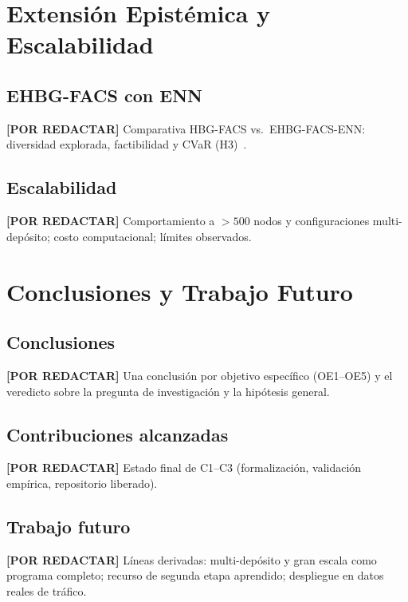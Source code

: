 \documentclass[12pt]{report}
\newcommand{\pendiente}[1]{\par\noindent\colorbox{lightbg}{%
  \begin{minipage}{0.94\linewidth}\small
  \textcolor{uanlgold}{\textbf{[POR REDACTAR]}} #1
  \end{minipage}}\par\medskip}
\begin{document}
\chapter{Extensi\'on Epist\'emica y Escalabilidad}\label{cap:enn}

\section{EHBG-FACS con ENN}\label{sec:enn-resultados}
\pendiente{Comparativa HBG-FACS vs.\ EHBG-FACS-ENN: diversidad explorada,
factibilidad y CVaR (H3)~\cite{ENN_GFN_2025}.}

\section{Escalabilidad}\label{sec:escalabilidad}
\pendiente{Comportamiento a $>500$ nodos y configuraciones multi-dep\'osito;
costo computacional; l\'imites observados.}

\chapter{Conclusiones y Trabajo Futuro}\label{cap:conclusiones}

\section{Conclusiones}\label{sec:conclusiones}
\pendiente{Una conclusi\'on por objetivo espec\'ifico (OE1--OE5) y el veredicto
sobre la pregunta de investigaci\'on y la hip\'otesis general.}

\section{Contribuciones alcanzadas}\label{sec:contrib-finales}
\pendiente{Estado final de C1--C3 (formalizaci\'on, validaci\'on emp\'irica,
repositorio liberado).}

\section{Trabajo futuro}\label{sec:futuro}
\pendiente{L\'ineas derivadas: multi-dep\'osito y gran escala como programa
completo; recurso de segunda etapa aprendido; despliegue en datos reales de
tr\'afico.}
\end{document}

